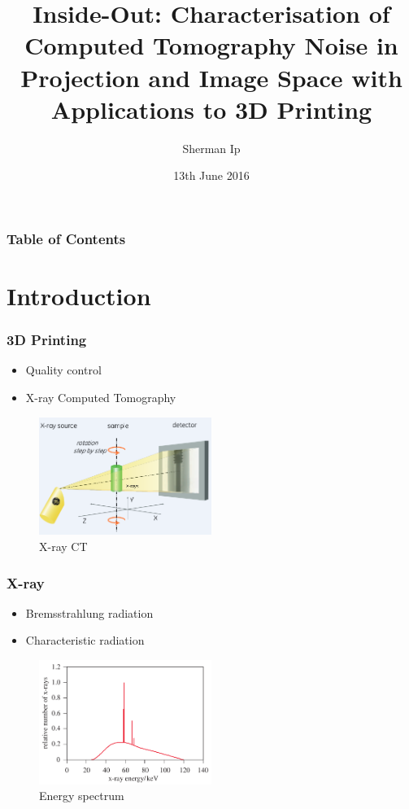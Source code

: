 \documentclass{beamer}
\title{Inside-Out: Characterisation of Computed Tomography Noise in Projection and Image Space with Applications to 3D Printing}
\author{Sherman Ip}
\institute{University of Warwick}
\date{13th June 2016}
\begin{document}
\frame{\titlepage}

\begin{frame}
\frametitle{Table of Contents}
\tableofcontents
\end{frame}

\section{Introduction}

\begin{frame}
\frametitle{3D Printing}
\begin{itemize}
	\item Quality control
	\item X-ray Computed Tomography
\end{itemize}
\begin{figure}
	\includegraphics[width=0.5\textwidth]{figures/x_ray_ct.png}
	\caption{X-ray CT}
\end{figure}
\end{frame}

\begin{frame}
\frametitle{X-ray}
\begin{itemize}
	\item Bremsstrahlung radiation
	\item Characteristic radiation
\end{itemize}
\begin{figure}
	\includegraphics[width=0.5\textwidth]{figures/x_ray_spectrum.png}
	\caption{Energy spectrum}
\end{figure}
\end{frame}
\end{document}

